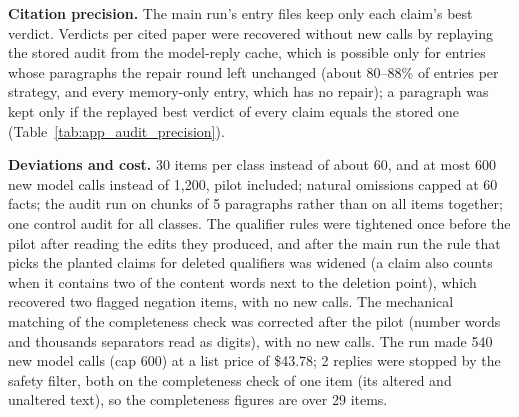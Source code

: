 \documentclass{article} %
\begin{document}
\textbf{Citation precision.} The main run's entry files keep only each claim's best verdict. Verdicts per cited paper were recovered without new calls by replaying the stored audit from the model-reply cache, which is possible only for entries whose paragraphs the repair round left unchanged (about 80--88\% of entries per strategy, and every memory-only entry, which has no repair); a paragraph was kept only if the replayed best verdict of every claim equals the stored one (Table~\ref{tab:app_audit_precision}).

\textbf{Deviations and cost.} 30 items per class instead of about 60, and at most 600 new model calls instead of 1,200, pilot included; natural omissions capped at 60 facts; the audit run on chunks of 5 paragraphs rather than on all items together; one control audit for all classes. The qualifier rules were tightened once before the pilot after reading the edits they produced, and after the main run the rule that picks the planted claims for deleted qualifiers was widened (a claim also counts when it contains two of the content words next to the deletion point), which recovered two flagged negation items, with no new calls. The mechanical matching of the completeness check was corrected after the pilot (number words and thousands separators read as digits), with no new calls. The run made 540 new model calls (cap 600) at a list price of \$43.78; 2 replies were stopped by the safety filter, both on the completeness check of one item (its altered and unaltered text), so the completeness figures are over 29 items.
\end{document}
